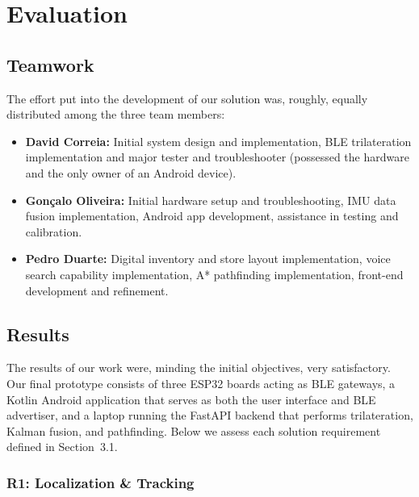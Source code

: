 \documentclass[12pt,a4paper]{article}
\begin{document}
\section{Evaluation}

\subsection{Teamwork}

The effort put into the development of our solution was, roughly, equally distributed among the three team members:
\begin{itemize}
\item \textbf{David Correia:} Initial system design and implementation, BLE trilateration implementation and major tester and troubleshooter (possessed the hardware and the only owner of an Android device).
\item  \textbf{Gonçalo Oliveira:} Initial hardware setup and troubleshooting, IMU data fusion implementation, Android app development, assistance in testing and calibration.
\item \textbf{Pedro Duarte:} Digital inventory and store layout implementation, voice search capability implementation, A* pathfinding implementation, front-end development and refinement.

\end{itemize}

\subsection{Results}


The results of our work were, minding the initial objectives, very satisfactory. Our final prototype consists of three ESP32 boards acting as BLE gateways, a Kotlin Android application that serves as both the user interface and BLE advertiser, and a laptop running the FastAPI backend that performs trilateration, Kalman fusion, and pathfinding. Below we assess each solution requirement defined in Section~3.1.

\subsubsection*{R1: Localization \& Tracking}
\end{document}
